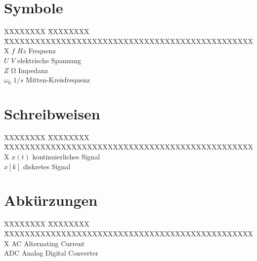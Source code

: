 \label{ch:symbole}
\section*{Symbole}
\begin{tabbing}
XXXXXXXX \= XXXXXXXX \= XXXXXXXXXXXXXXXXXXXXXXXXXXXXXXXXXXXXXXXXXXXXXXXXX \kill
$f$							\> $\si{Hz}$			\> Frequenz \\
$U$							\> $\si{V}$				\> elektrische Spannung \\
$Z$							\> $\si{\ohm}$			\> Impedanz \\

$\omega_0$					\> $\si{1/s}$			\> Mitten-Kreisfrequenz \\
\end{tabbing}

\section*{Schreibweisen}
\begin{tabbing}
XXXXXXXX \= XXXXXXXX \= XXXXXXXXXXXXXXXXXXXXXXXXXXXXXXXXXXXXXXXXXXXXXXXXX \kill
$x(t)$						\> 						\> kontinuierliches Signal \\
$x[k]$						\> 						\> diskretes Signal \\
\end{tabbing}

\section*{Abkürzungen}
\begin{tabbing}
XXXXXXXX \= XXXXXXXX \= XXXXXXXXXXXXXXXXXXXXXXXXXXXXXXXXXXXXXXXXXXXXXXXXX \kill
AC							\>						\> Alternating Current \\
ADC							\> 						\> Analog Digital Converter \\
\end{tabbing}
